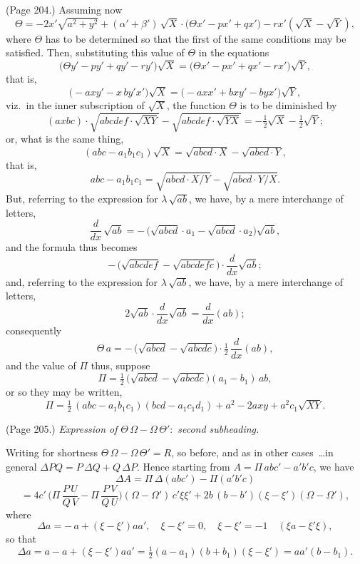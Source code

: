 \documentclass[11pt,a4paper]{article}
\theoremstyle{plain}
\theoremstyle{definition}
\newcommand{\Th}{\Theta} %
\begin{document}
\noindent (Page 204.) Assuming now
\[
\Th = -2x'\sqrt{a^2 + y^2} + (\alpha' + \beta')\,\sqrt{X} \cdot \big(\Th x' - p x' + q x'\big) - r x' (\sqrt{X} - \sqrt{Y}),
\]
where $\Th$ has to be determined so that the first of the same conditions may be satisfied. Then, substituting this value of $\Th$ in the equations
\[
\Big(\Th y' - p y' + q y' - r y'\Big) \sqrt{X} = \Big(\Th x' - p x' + q x' - r x'\Big) \sqrt{Y},
\]
that is,
\[
\Big( - a x y' - x\,b y' x'\Big) \sqrt{X} = \Big( - a x x' + b x y' - b y x'\Big) \sqrt{Y},
\]
viz.\ in the inner subscription of $\sqrt{X}$, the function $\Theta$ is to be diminished by
\[
(a x b c) \cdot \sqrt{a b c d e f \cdot \sqrt{X Y}} - \sqrt{a b c d e f \cdot \sqrt{Y X}} = - \tfrac{1}{2}\sqrt{X} - \tfrac{1}{2}\sqrt{Y};
\]
or, what is the same thing,
\[
(a b c - a_1 b_1 c_1) \sqrt{X} = \sqrt{a b c d \cdot X} - \sqrt{a b c d \cdot Y},
\]
that is,
\[
a b c - a_1 b_1 c_1 = \sqrt{a b c d \cdot X / Y} - \sqrt{a b c d \cdot Y / X}.
\]
But, referring to the expression for $\lambda\,\sqrt{a b}$, we have, by a mere interchange of letters,
\[
\frac{d}{dx}\,\sqrt{a b} = -\,\big(\sqrt{a b c d} \cdot a_1 - \sqrt{a b c d} \cdot a_2\big) \sqrt{a b},
\]
and the formula thus becomes
\[
-\,\big(\sqrt{a b c d e f} - \sqrt{a b c d e f c}\big) \cdot \frac{d}{dx} \sqrt{a b};
\]
and, referring to the expression for $\lambda\,\sqrt{a b}$, we have, by a mere interchange of letters,
\[
2 \sqrt{a b} \cdot \frac{d}{dx} \sqrt{a b} = \frac{d}{dx} (a b);
\]
consequently
\[
\Theta\,a = -\,\big(\sqrt{a b c d} - \sqrt{a b c d c}\big) \cdot \tfrac{1}{2} \, \frac{d}{dx}(a b),
\]
and the value of $\Pi$ thus, suppose
\[
\Pi = \tfrac{1}{2}\,\big(\sqrt{a b c d} - \sqrt{a b c d c}\big) (a_1 - b_1)\, a b,
\]
or so they may be written,
\[
\Pi = \tfrac{1}{2}\,(a b c - a_1 b_1 c_1)(b c d - a_1 c_1 d_1) + a^2 - 2 a x y + a^2 c_1 \sqrt{X Y}.
\]

\medskip

\noindent (Page 205.) \emph{Expression of} $\Th\,\Omega - \Omega\,\Th'$:\ \emph{second subheading.}

Writing for shortness $\Th\,\Omega - \Omega\,\Th' = R$, so before, and as in other cases\ \ldots in general $\Delta P Q = P\,\Delta Q + Q\,\Delta P$. Hence starting from $A = \Pi\,abc' - a'b'c$, we have
\[
\Delta A = \Pi\,\Delta(abc') - \Pi(a'b'c)
\]
\[
= 4 c'\,\Big(\Pi\,\frac{P\,U}{Q\,V} - \Pi\,\frac{P\,V}{Q\,U}\Big)(\Omega - \Omega')\,c' \xi \xi' + 2 b\,(b - b') (\xi - \xi') (\Omega - \Omega'),
\]
where
\[
\Delta a = -\,a + (\xi - \xi') a a', \quad \xi - \xi' = 0, \quad \xi - \xi' = -1 \quad (\xi a - \xi' \xi),
\]
so that
\[
\Delta a = a - a + (\xi - \xi') a a' = \tfrac{1}{2}(a - a_1) (b + b_1) (\xi - \xi') = aa' (b - b_1).
\]
\end{document}

